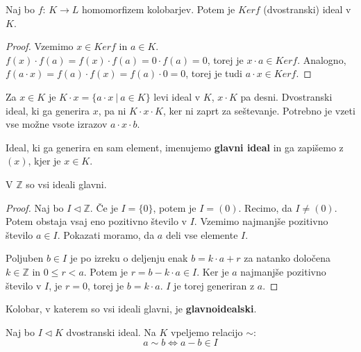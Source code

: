 \documentclass[11pt, a4paper]{article}
\begin{document}
    \begin{proposition}
        Naj bo \(f\): \(K \to L\) homomorfizem kolobarjev. Potem je \(Ker f\) (dvostranski) ideal v \(K\).
    \end{proposition}

    \begin{proof}
        Vzemimo \(x \in Ker f\) in \(a \in K\). \(f(x) \cdot f(a) = f(x) \cdot f(a) = 0 \cdot f(a) = 0\), torej je \(x \cdot a \in Ker f\). Analogno, \(f(a \cdot x) = f(a) \cdot f(x) = f(a) \cdot 0 = 0\), torej je tudi \(a \cdot x \in Ker f\).
    \end{proof}

    Za \(x \in K\) je \(K \cdot x = \{a \cdot x\ |\ a \in K\}\) levi ideal v \(K\), \(x \cdot K\) pa desni. Dvostranski ideal, ki ga generira \(x\), pa ni \(K \cdot x \cdot K\), ker ni zaprt za seštevanje. Potrebno je vzeti vse možne vsote izrazov \(a \cdot x \cdot b\).

    \begin{definition}
        Ideal, ki ga generira en sam element, imenujemo \textbf{glavni ideal} in ga zapišemo z \((x)\), kjer je \(x \in K\).
    \end{definition}

    \begin{proposition}
        V \(\mathbb{Z}\) so vsi ideali glavni.
    \end{proposition}

    \begin{proof}
        Naj bo \(I \triangleleft \mathbb{Z}\). Če je \(I = \{0\}\), potem je \(I = (0)\). Recimo, da \(I \neq (0)\). Potem obstaja vsaj eno pozitivno število v \(I\). Vzemimo najmanjše pozitivno število \(a \in I\). Pokazati moramo, da \(a\) deli vse elemente \(I\).
        \par
        Poljuben \(b \in I\) je po izreku o deljenju enak \(b = k \cdot a + r\) za natanko določena \(k \in \mathbb{Z}\) in \(0 \le r < a\). Potem je \(r = b - k \cdot a \in I\). Ker je \(a\) najmanjše pozitivno število v \(I\), je \(r = 0\), torej je \(b = k \cdot a\). \(I\) je torej generiran z \(a\).
    \end{proof}

    \begin{definition}
        Kolobar, v katerem so vsi ideali glavni, je \textbf{glavnoidealski}.
    \end{definition}

    Naj bo \(I \triangleleft K\) dvostranski ideal. Na \(K\) vpeljemo relacijo \(\sim\):
    \[a \sim b \Longleftrightarrow a - b \in I\]
\end{document}
